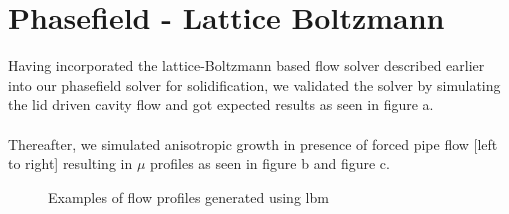 \documentclass[12pt,a4paper]{report}
\begin{document}
\section{Phasefield - Lattice Boltzmann}
Having incorporated the lattice-Boltzmann based flow solver described earlier into
our phasefield solver for solidification, we validated the solver by simulating 
the lid driven cavity flow and got expected results as seen in figure a.\\
\\
Thereafter, we simulated anisotropic growth in presence of forced pipe flow 
[left to right] resulting in $\mu$ profiles as seen in figure b and figure c. 
					\begin{figure}[H]
						\centering
						\hspace{.3in}
						\hspace{.3in}
						\centering
						\caption{Examples of flow profiles generated using lbm}
					\end{figure}
\end{document}
